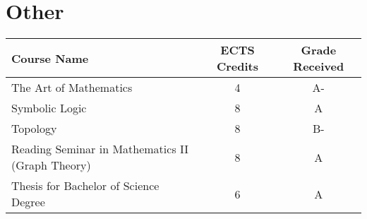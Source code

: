 \documentclass[11pt]{article}
\begin{document}
\section*{Other}

\begin{center}
\begin{tabular}{lcc}
Course Name & ECTS Credits & Grade Received \\ \toprule
The Art of Mathematics & 4 & A- \\
Symbolic Logic & 8 & A \\
Topology & 8 & B- \\
Reading Seminar in Mathematics II (Graph Theory) & 8 & A \\
Thesis for Bachelor of Science Degree & 6 & A
\end{tabular}
\end{center}
\end{document}
